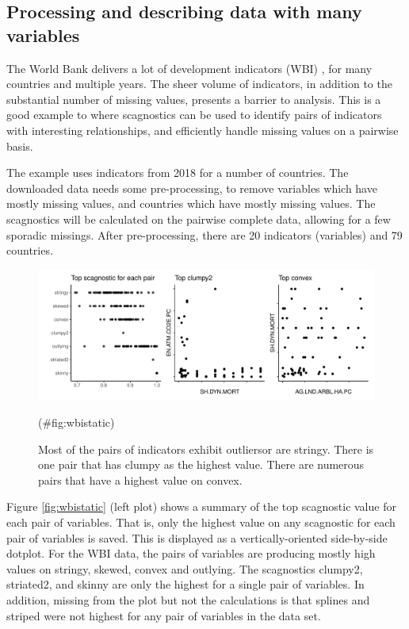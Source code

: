 \hypertarget{processing-and-describing-data-with-many-variables}{%
\subsection{Processing and describing data with many
variables}\label{processing-and-describing-data-with-many-variables}}

The World Bank delivers a lot of development indicators (WBI)
\citep{WBI}, for many countries and multiple years. The sheer volume of
indicators, in addition to the substantial number of missing values,
presents a barrier to analysis. This is a good example to where
scagnostics can be used to identify pairs of indicators with interesting
relationships, and efficiently handle missing values on a pairwise
basis.

The example uses indicators from 2018 for a number of countries. The
downloaded data needs some pre-processing, to remove variables which
have mostly missing values, and countries which have mostly missing
values. The scagnostics will be calculated on the pairwise complete
data, allowing for a few sporadic missings. After pre-processing, there
are 20 indicators (variables) and 79 countries.

\begin{Schunk}
\begin{figure}
\includegraphics[width=1\linewidth]{mason-lee-laa-cook_files/figure-latex/wbistatic-1} \caption[Most of the pairs of indicators exhibit outliersor are stringy]{Most of the pairs of indicators exhibit outliersor are stringy. There is one pair that has clumpy as the highest value. There are numerous pairs that have a highest value on convex.}(\#fig:wbistatic)
\end{figure}
\end{Schunk}

Figure \ref{fig:wbistatic} (left plot) shows a summary of the top
scagnostic value for each pair of variables. That is, only the highest
value on any scagnostic for each pair of variables is saved. This is
displayed as a vertically-oriented side-by-side dotplot. For the WBI
data, the pairs of variables are producing mostly high values on
stringy, skewed, convex and outlying. The scagnostics clumpy2,
striated2, and skinny are only the highest for a single pair of
variables. In addition, missing from the plot but not the calculations
is that splines and striped were not highest for any pair of variables
in the data set.

